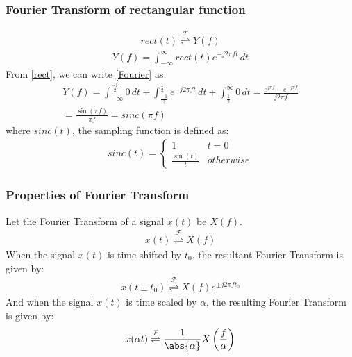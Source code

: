 \documentclass{beamer}
\providecommand{\brak}[1]{\ensuremath{\left(#1\right)}}
\providecommand{\fourier}{\overset{\mathcal{F}}{ \rightleftharpoons}}
\begin{document}
\begin{frame}
    \frametitle{Fourier Transform of rectangular function}
    \begin{flushleft}
    \begin{align}
    rect(t) \fourier Y(f)
    \end{align}
    \begin{align}
    Y(f) = \int_{-\infty}^\infty rect(t)e^{-j2\pi f t}\,dt
    \label{Fourier}
\end{align}
From \eqref{rect}, we can write \eqref{Fourier} as:
\begin{align}
   Y(f) = \int_{-\infty}^\frac{-1}{2} 0\,dt + \int_{\frac{-1}{2}}^\frac{1}{2} e^{-j2\pi ft}\,dt + \int_\frac{1}{2}^\infty 0\,dt
    = \frac{e^{j\pi f} - e^{-j \pi f}}{j2\pi f}\\
      = \frac{\sin (\pi f)}{\pi f}
       = sinc(\pi f)
\end{align}
where $sinc(t)$, the sampling function is defined as:
\begin{align}
    sinc(t) = 
    \begin{cases}
    1 & t = 0\\
    \frac{\sin(t)}{t} & otherwise
    \end{cases}
\end{align}
    \end{flushleft}
\end{frame}
\begin{frame}
    \frametitle{Properties of Fourier Transform}
    \begin{flushleft}
    Let the Fourier Transform of a signal $x(t)$ be $X(f)$.
\begin{align}
    x(t) \fourier X(f)
\end{align}
When the signal $x(t)$ is time shifted by $t_0$, the resultant Fourier Transform is given by:
\begin{align}
    x(t \pm t_0) \fourier X(f)e^{\pm j2\pi ft_0}
    \label{shift}
\end{align}
And when the signal $x(t)$ is time scaled by $\alpha$, the resulting Fourier Transform is given by:
\begin{align}
    x(\alpha t) \fourier \frac{1}{\abs{\alpha}}X\brak{\frac{f}{\alpha}}
    \label{scale}
\end{align}
    \end{flushleft}
\end{frame}
\end{document}
